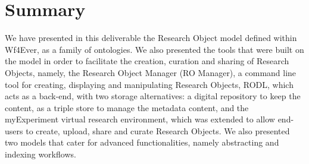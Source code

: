 \section{Summary}
\label{sec:conclusions}

We have presented in this deliverable the Research Object model defined within Wf4Ever, as a family of ontologies. We also presented the tools that were built on the model in order to facilitate the creation, curation and sharing of Research Objects, namely, the Research Object Manager (RO Manager), a command line tool for creating, displaying and manipulating Research Objects, RODL, which acts as a back-end, with two storage alternatives: a digital repository to keep the content, as a triple store to manage the metadata content, and the myExperiment virtual research environment, which was extended to allow end-users to create, upload, share and curate Research Objects. We also presented two models that cater for advanced functionalities, namely abstracting and indexing workflows.
